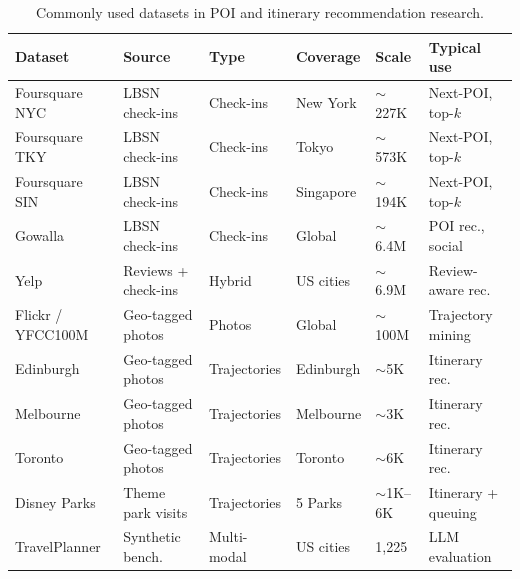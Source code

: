 
\begin{table}[H]
\centering
\caption{Commonly used datasets in POI and itinerary recommendation research.}

\label{tab:datasets}
\small
\renewcommand{\arraystretch}{1.2} %
\begin{tabularx}{\textwidth}{l l l l l X}
\toprule
\textbf{Dataset} & \textbf{Source} & \textbf{Type} & \textbf{Coverage} & \textbf{Scale} & \textbf{Typical use} \\
\midrule
Foursquare NYC & LBSN check-ins & Check-ins & New York & $\sim$227K & Next-POI, top-$k$ \\
Foursquare TKY & LBSN check-ins & Check-ins & Tokyo & $\sim$573K & Next-POI, top-$k$ \\
Foursquare SIN & LBSN check-ins & Check-ins & Singapore & $\sim$194K & Next-POI, top-$k$ \\
Gowalla & LBSN check-ins & Check-ins & Global & $\sim$6.4M & POI rec., social \\
Yelp & Reviews + check-ins & Hybrid & US cities & $\sim$6.9M & Review-aware rec. \\
\midrule
Flickr / YFCC100M & Geo-tagged photos & Photos & Global & $\sim$100M & Trajectory mining \\
Edinburgh & Geo-tagged photos & Trajectories & Edinburgh & $\sim$5K & Itinerary rec. \\
Melbourne & Geo-tagged photos & Trajectories & Melbourne & $\sim$3K & Itinerary rec. \\
Toronto & Geo-tagged photos & Trajectories & Toronto & $\sim$6K & Itinerary rec. \\
\midrule
Disney Parks & Theme park visits & Trajectories & 5 Parks & $\sim$1K--6K & Itinerary + queuing \\
\midrule
TravelPlanner & Synthetic bench. & Multi-modal & US cities & 1,225 & LLM evaluation \\
\bottomrule
\end{tabularx}
\end{table}